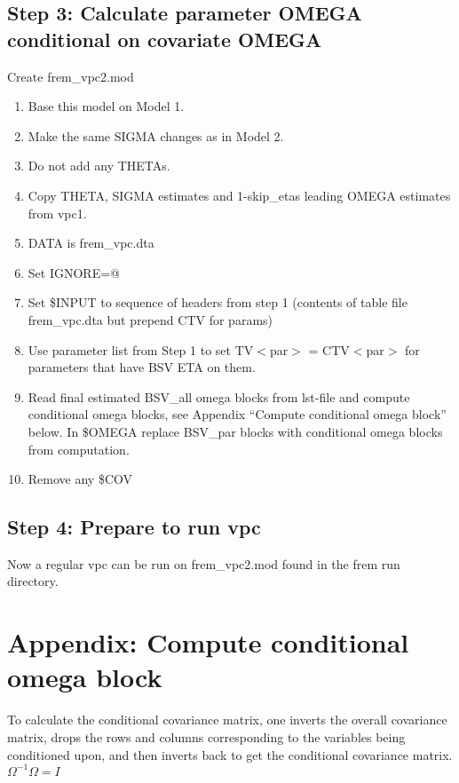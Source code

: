 \subsection{Step 3:  Calculate parameter OMEGA conditional on covariate OMEGA}
Create frem\_vpc2.mod
\begin{enumerate}
	\item Base this model on Model 1. %
    \item Make the same SIGMA changes as in Model 2.
    \item Do not add any THETAs.
    \item Copy THETA, SIGMA estimates and 1-skip\_etas leading OMEGA estimates from vpc1.
	\item DATA is frem\_vpc.dta
	\item Set IGNORE=@
	\item Set \$INPUT to sequence of headers from step 1 (contents of table file frem\_vpc.dta but prepend CTV for params)
	\item Use parameter list from Step 1 to set TV$<$par$>$ = CTV$<$par$>$ for
parameters that have BSV ETA %
on them.
	\item Read final estimated BSV\_all omega blocks from lst-file and compute conditional omega blocks,
    see Appendix “Compute conditional omega block” below. In \$OMEGA replace BSV\_par blocks with
    conditional omega blocks from computation.
    \item Remove any \$COV
\end{enumerate}

\subsection{Step 4: Prepare to run  vpc}
Now a regular vpc can be run on frem\_vpc2.mod found in the frem run directory.


\section{Appendix: Compute conditional omega block}
To calculate the conditional covariance matrix,
one inverts the overall covariance matrix,
drops the rows and columns corresponding to the variables being conditioned upon, and then inverts back to get the conditional covariance matrix.
\begin{math}
\Omega^{-1}\Omega = I
\end{math}

